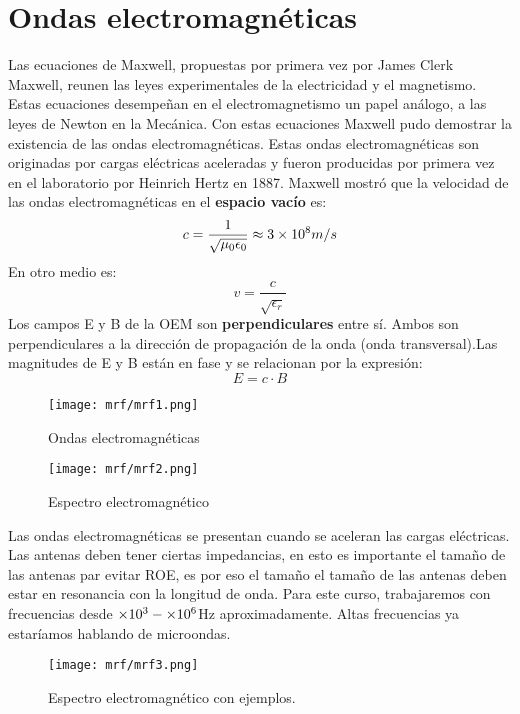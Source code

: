 \documentclass[
	12pt, %
	fleqn, %
	a4paper, %
	oneside, %
]{LegrandOrangeBook}
\begin{document}
\section{Ondas electromagnéticas}
Las ecuaciones de Maxwell, propuestas por primera vez por James Clerk Maxwell, reunen las leyes experimentales de la electricidad y el magnetismo. Estas ecuaciones desempeñan en el electromagnetismo un papel análogo, a las leyes de Newton en la Mecánica. Con estas ecuaciones Maxwell pudo demostrar la existencia de las ondas electromagnéticas. Estas ondas electromagnéticas son originadas por cargas eléctricas aceleradas y fueron producidas por primera vez en el laboratorio por Heinrich Hertz en 1887.
Maxwell mostró que la velocidad de las ondas electromagnéticas en el \textbf{espacio vacío} es:
\begin{equation}
c=\frac{1}{\sqrt{\mu_0\epsilon_0}}\approx 3\times 10^{8} m/s
\label{eq:vel luz}
\end{equation}
En otro medio es:
\begin{equation}
v=\frac{c}{\sqrt{\epsilon_r}}
\label{eq:velocidad relativa}
\end{equation}
Los campos E y B de la OEM son \textbf{perpendiculares} entre sí. Ambos son perpendiculares a la dirección de propagación de la onda (onda transversal).Las magnitudes de E y B están en fase y se relacionan por la expresión:
\begin{displaymath}
E=c\cdot B
\end{displaymath}
\begin{figure}[H]
\centering
\texttt{[image: mrf/mrf1.png]}
\caption{Ondas electromagnéticas}
\end{figure}
\begin{figure}[H]
\centering
\texttt{[image: mrf/mrf2.png]}
\caption{Espectro electromagnético}
\end{figure}
Las ondas electromagnéticas se presentan cuando se aceleran las cargas eléctricas. Las antenas deben tener ciertas impedancias, en esto es importante el tamaño de las antenas par evitar ROE, es por eso el tamaño el tamaño de las antenas deben estar en resonancia con la longitud de onda. Para este curso, trabajaremos con frecuencias desde $\times 10^{3}-\times 10^{6}$Hz aproximadamente. Altas frecuencias ya estaríamos hablando de microondas.
\begin{figure}[H]
\centering
\texttt{[image: mrf/mrf3.png]}
\caption{Espectro electromagnético con ejemplos.}
\end{figure}
\end{document}
